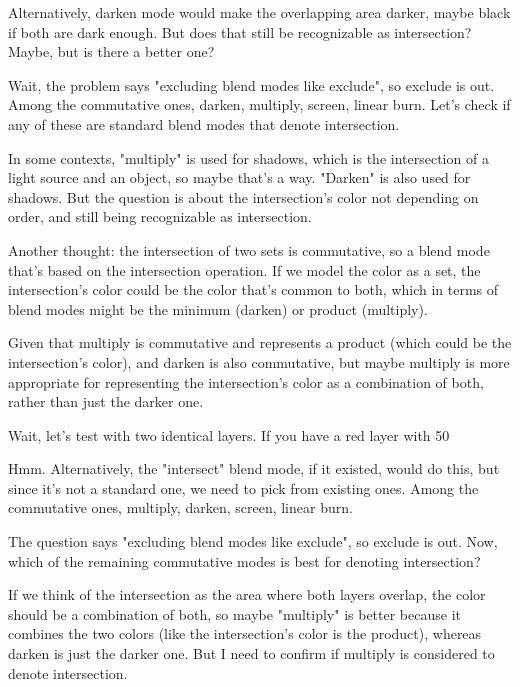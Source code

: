 Alternatively, darken mode would make the overlapping area darker, maybe black if both are dark enough. But does that still be recognizable as intersection? Maybe, but is there a better one? 

Wait, the problem says "excluding blend modes like exclude", so exclude is out. Among the commutative ones, darken, multiply, screen, linear burn. Let's check if any of these are standard blend modes that denote intersection. 

In some contexts, "multiply" is used for shadows, which is the intersection of a light source and an object, so maybe that's a way. "Darken" is also used for shadows. But the question is about the intersection's color not depending on order, and still being recognizable as intersection. 

Another thought: the intersection of two sets is commutative, so a blend mode that's based on the intersection operation. If we model the color as a set, the intersection's color could be the color that's common to both, which in terms of blend modes might be the minimum (darken) or product (multiply). 

Given that multiply is commutative and represents a product (which could be the intersection's color), and darken is also commutative, but maybe multiply is more appropriate for representing the intersection's color as a combination of both, rather than just the darker one. 

Wait, let's test with two identical layers. If you have a red layer with 50%

Hmm. Alternatively, the "intersect" blend mode, if it existed, would do this, but since it's not a standard one, we need to pick from existing ones. Among the commutative ones, multiply, darken, screen, linear burn. 

The question says "excluding blend modes like exclude", so exclude is out. Now, which of the remaining commutative modes is best for denoting intersection? 

If we think of the intersection as the area where both layers overlap, the color should be a combination of both, so maybe "multiply" is better because it combines the two colors (like the intersection's color is the product), whereas darken is just the darker one. But I need to confirm if multiply is considered to denote intersection. 

